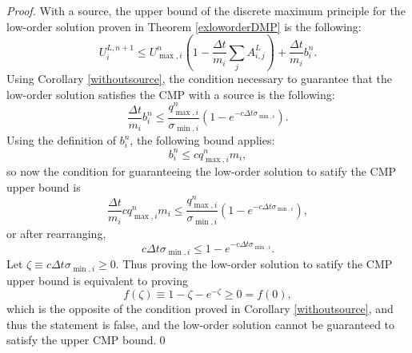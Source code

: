 \begin{proof}
With a source, the upper bound of the discrete maximum principle for the low-order solution
proven in Theorem \ref{exloworderDMP} is the following:
\[
   U_i^{L,n+1}\leq
   U_{\max,i}^n\left(1-\frac{\Delta t}{m_i}\sum\limits_j A^L_{i,j}\right)
   + \frac{\Delta t}{m_i}b_i^n.
\]
Using Corollary \ref{withoutsource}, the condition necessary to guarantee that
the low-order solution satisfies the CMP with a source is the following:
\[
   \frac{\Delta t}{m_i}b_i^n \le \frac{q_{\max,i}^n}{\sigma_{\min,i}}
   (1-e^{-c\Delta t\sigma_{\min,i}}).
\]
Using the definition of $b_i^n$, the following bound applies:
\[
   b_i^n \le c q_{\max,i}^n m_i,
\]
so now the condition for guaranteeing the low-order solution to satify the CMP upper bound is
\[
   \frac{\Delta t}{m_i}c q_{\max,i}^n m_i \le
   \frac{q_{\max,i}^n}{\sigma_{\min,i}}(1-e^{-c\Delta t\sigma_{\min,i}}),
\]
or after rearranging,
\[
   c\Delta t\sigma_{\min,i} \le
   1-e^{-c\Delta t\sigma_{\min,i}}.
\]
Let $\zeta\equiv c\Delta t\sigma_{\min,i}\ge 0$. Thus proving the low-order solution to
satify the CMP upper bound is equivalent to proving
\[
   f(\zeta)\equiv 1-\zeta-e^{-\zeta} \ge 0 = f(0),
\]
which is the opposite of the condition proved in Corollary \ref{withoutsource},
and thus the statement is false, and the low-order solution cannot be
guaranteed to satisfy the upper CMP bound.\qed
\end{proof}

